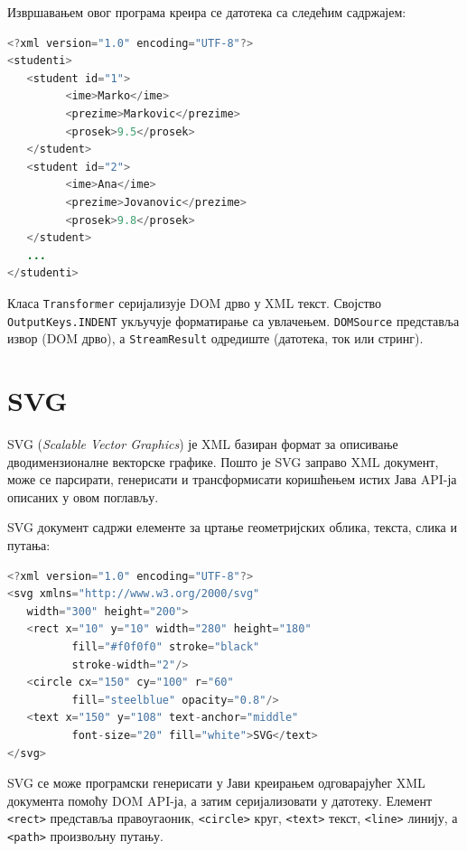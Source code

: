 Извршавањем овог програма креира се датотека са следећим садржајем:


\begin{lstlisting}[language=Java]
<?xml version="1.0" encoding="UTF-8"?>
<studenti>
   <student id="1">
         <ime>Marko</ime>
         <prezime>Markovic</prezime>
         <prosek>9.5</prosek>
   </student>
   <student id="2">
         <ime>Ana</ime>
         <prezime>Jovanovic</prezime>
         <prosek>9.8</prosek>
   </student>
   ...
</studenti>
\end{lstlisting}


Класа \texttt{Transformer} серијализује DOM дрво у XML текст. Својство \texttt{OutputKeys.INDENT} укључује форматирање са увлачењем. \texttt{DOMSource} представља извор (DOM дрво), а \texttt{StreamResult} одредиште (датотека, ток или стринг).


\section{SVG}

SVG (\textit{Scalable Vector Graphics}) је XML базиран формат за описивање дводимензионалне векторске графике. Пошто је SVG заправо XML документ, може се парсирати, генерисати и трансформисати коришћењем истих Јава API-ја описаних у овом поглављу.

SVG документ садржи елементе за цртање геометријских облика, текста, слика и путања:


\begin{lstlisting}[language=Java]
<?xml version="1.0" encoding="UTF-8"?>
<svg xmlns="http://www.w3.org/2000/svg"
   width="300" height="200">
   <rect x="10" y="10" width="280" height="180"
          fill="#f0f0f0" stroke="black"
          stroke-width="2"/>
   <circle cx="150" cy="100" r="60"
          fill="steelblue" opacity="0.8"/>
   <text x="150" y="108" text-anchor="middle"
          font-size="20" fill="white">SVG</text>
</svg>
\end{lstlisting}


SVG се може програмски генерисати у Јави креирањем одговарајућег XML документа помоћу DOM API-ја, а затим серијализовати у датотеку. Елемент \texttt{\textless{}rect\textgreater{}} представља правоугаоник, \texttt{\textless{}circle\textgreater{}} круг, \texttt{\textless{}text\textgreater{}} текст, \texttt{\textless{}line\textgreater{}} линију, а \texttt{\textless{}path\textgreater{}} произвољну путању.

